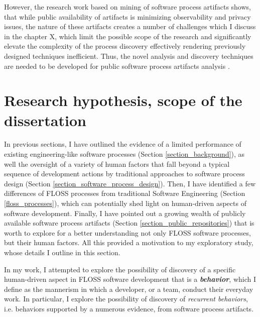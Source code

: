 However, the research work based on mining of software process artifacts shows, that while public availability 
of artifacts is minimizing observability and privacy issues, the nature of these artifacts creates a number of 
challenges which I discuss in the chapter X, which limit the possible scope of the research and significantly 
elevate the complexity of the process discovery effectively rendering previously designed techniques inefficient.
Thus, the novel analysis and discovery techniques are needed to be developed for public software process artifacts 
analysis \cite{citeulike:7853299}.

%
%
\section{Research hypothesis, scope of the dissertation}\label{section_research_hypothesis}
In previous sections, I have outlined the evidence of a limited performance of existing engineering-like 
software processes (Section \ref{section_background}),
as well the oversight of a variety of human factors that fall beyond a typical sequence of development 
actions by traditional approaches to software process design (Section \ref{section_software_process_design}).
Then, I have identified a few differences of FLOSS processes from traditional Software Engineering 
(Section \ref{floss_processes}), which can potentially shed light on human-driven aspects of software development.
Finally, I have pointed out a growing wealth of publicly available software process artifacts 
(Section \ref{section_public_repositories}) that is worth to explore for a better understanding not only 
FLOSS software processes, but their human factors. All this provided a motivation to my exploratory study, 
whose details I outline in this section.

In my work, I attempted to explore the possibility of discovery of a specific human-driven aspect in 
FLOSS software development that is a \textit{\textbf{behavior}}, which I define as the mannerism in which a 
developer, or a team, conduct their everyday work. 
In particular, I explore the possibility of discovery of \textit{recurrent behaviors}, i.e. behaviors supported 
by a numerous evidence, from software process artifacts. 

